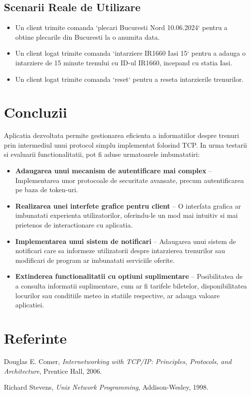 \documentclass[runningheads]{llncs}
\begin{document}
\subsection{Scenarii Reale de Utilizare}
\begin{itemize}
    \item Un client trimite comanda `plecari Bucuresti Nord 10.06.2024` pentru a obtine plecarile din Bucuresti la o anumita data.
    \item Un client logat trimite comanda `intarziere IR1660 Iasi 15` pentru a adauga o intarziere de 15 minute trenului cu ID-ul IR1660, incepand cu statia Iasi.
    \item Un client logat trimite comanda `reset` pentru a reseta intarzierile trenurilor.
\end{itemize}

\section{Concluzii}
Aplicatia dezvoltata permite gestionarea eficienta a informatiilor despre trenuri prin intermediul unui protocol simplu implementat folosind TCP. In urma testarii si evaluarii functionalitatii, pot fi aduse urmatoarele imbunatatiri:

\begin{itemize}
    \item \textbf{Adaugarea unui mecanism de autentificare mai complex} – Implementarea unor protocoale de securitate avansate, precum autentificarea pe baza de token-uri.
    \item \textbf{Realizarea unei interfete grafice pentru client} – O interfata grafica ar imbunatati experienta utilizatorilor, oferindu-le un mod mai intuitiv si mai prietenos de interactionare cu aplicatia.
    \item \textbf{Implementarea unui sistem de notificari} – Adaugarea unui sistem de notificari care sa informeze utilizatorii despre intarzierea trenurilor sau modificari de program ar imbunatati serviciile oferite.
    \item \textbf{Extinderea functionalitatii cu optiuni suplimentare} – Posibilitatea de a consulta informatii suplimentare, cum ar fi tarifele biletelor, disponibilitatea locurilor sau conditiile meteo in statiile respective, ar adauga valoare aplicatiei.
\end{itemize}

\section*{Referinte}
\begin{thebibliography}{9}
Douglas E. Comer, \textit{Internetworking with TCP/IP: Principles, Protocols, and Architecture}, Prentice Hall, 2006.

Richard Stevens, \textit{Unix Network Programming}, Addison-Wesley, 1998.
\end{thebibliography}
\end{document}
